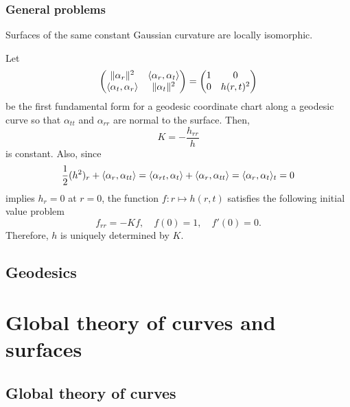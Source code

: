 \documentclass{../note}
\def\a{\alpha}
\begin{document}
\begin{prb}




\section{General problems}


\begin{thm}
Surfaces of the same constant Gaussian curvature are locally isomorphic.
\end{thm}
\begin{pf}
Let
\[\mat{\|\a_r\|^2&\<\a_r,\a_t\>\\\<\a_t,\a_r\>&\|\a_t\|^2}=\mat{1&0\\0&h(r,t)^2}\]
be the first fundamental form for a geodesic coordinate chart along a geodesic curve so that $\a_{tt}$ and $\a_{rr}$ are normal to the surface.
Then,
\[K=-\frac{h_{rr}}h\]
is constant.
Also, since
\[\frac12(h^2)_r+\<\a_r,\a_{tt}\>=\<\a_{rt},\a_t\>+\<\a_r,\a_{tt}\>=\<\a_r,\a_t\>_t=0\]
implies $h_r=0$ at $r=0$, the function $f:r\mapsto h(r,t)$ satisfies the following initial value problem
\[f_{rr}=-Kf,\quad f(0)=1,\quad f'(0)=0.\]
Therefore, $h$ is uniquely determined by $K$.
\end{pf}



\chapter{Geodesics}






























\part{Global theory of curves and surfaces}

\chapter{Global theory of curves}

\end{prb}
\end{document}
